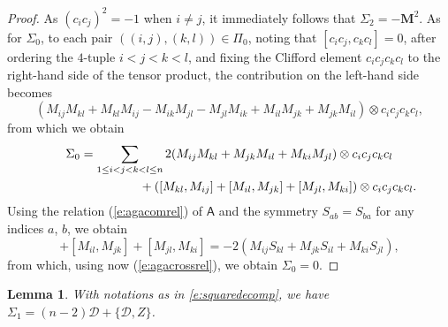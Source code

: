 \documentclass[10pt,a4paper]{amsart}
\numberwithin{equation}{section}
\newtheorem{Lemma}[Theorem]{Lemma}
\begin{document}
\begin{proof}
As $(c_ic_j)^2 = -1$ when $i\neq j$, it immediately follows that $\Sigma_2 = -\mathbf{M}^2$. As for $\Sigma_0$, to each pair $((i,j),(k,l)) \in \Pi_0$, noting that $[c_ic_j,c_kc_l]=0$, after ordering the $4$-tuple $i<j<k<l$,
and fixing the Clifford element $c_ic_jc_kc_l$ to the right-hand side of the tensor product, the contribution on the left-hand side becomes
\begin{equation*}
(M_{ij}M_{kl} + M_{kl}M_{ij} - M_{ik}M_{jl} - M_{jl}M_{ik} + M_{il}M_{jk} + M_{jk}M_{il})\otimes c_ic_jc_kc_l,
\end{equation*}
from which we obtain
\begin{gather*}
 \Sigma_0 = \sum_{1\leq i<j<k<l \leq n}
 2(M_{ij}M_{kl} + M_{jk}M_{il} + M_{ki}M_{jl})\otimes c_ic_jc_kc_l\\
\hphantom{\Sigma_0 = \sum_{1\leq i<j<k<l \leq n}}{}
+ ([M_{kl},M_{ij}] + [M_{il},M_{jk}] + [M_{jl},M_{ki}])\otimes c_ic_jc_kc_l.
\end{gather*}
Using the relation (\ref{e:agacomrel}) of $\mathsf{A}$ and the symmetry $S_{ab} = S_{ba}$ for any indices $a$, $b$, we obtain
\begin{equation*}
 [M_{kl},M_{ij}] + [M_{il},M_{jk}] + [M_{jl},M_{ki}] =
 -2(M_{ij}S_{kl} + M_{jk}S_{il} + M_{ki}S_{jl}),
\end{equation*}
from which, using now (\ref{e:agacrossrel}), we obtain $\Sigma_0=0$.
\end{proof}

\begin{Lemma}With notations as in \eqref{e:squaredecomp}, we have $\Sigma_1 = (n-2)\mathcal{D} + \{\mathcal{D},Z\}$.
\end{Lemma}
\end{document}
